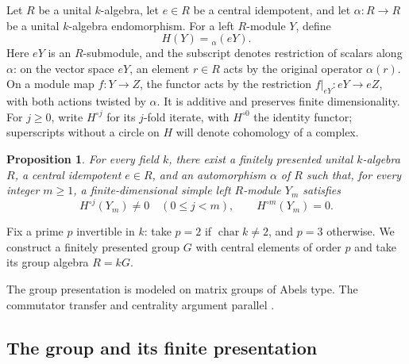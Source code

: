 \documentclass[11pt]{article}
\numberwithin{equation}{section}
\newtheorem{proposition}[theorem]{Proposition}
\theoremstyle{definition}
\theoremstyle{remark}
\begin{document}
Let $R$ be a unital $k$-algebra, let $e\in R$ be a central idempotent,
and let $\alpha:R\to R$ be a unital $k$-algebra endomorphism.  For a left
$R$-module $Y$, define
\begin{equation}
  H(Y)={}_{\alpha}(eY).
  \label{eq:selection-functor}
\end{equation}
Here $eY$ is an $R$-submodule, and the subscript denotes restriction of
scalars along $\alpha$: on the vector space $eY$, an element $r\in R$
acts by the original operator $\alpha(r)$. On a module map $f:Y\to Z$,
the functor acts by the restriction $f|_{eY}:eY\to eZ$, with both actions
twisted by $\alpha$. It is additive and preserves finite dimensionality.
For $j\ge0$, write $H^{\circ j}$ for its $j$-fold iterate, with
$H^{\circ 0}$ the identity functor; superscripts without a circle on
$H$ will denote cohomology of a complex.

\begin{proposition}
\label{prop:selection}
For every field $k$, there exist a finitely presented unital $k$-algebra $R$, a central
idempotent $e\in R$, and an automorphism $\alpha$ of $R$ such that, for
every integer $m\geq 1$, a finite-dimensional simple left $R$-module $Y_m$
satisfies
\begin{equation}
  H^{\circ j}(Y_m)\neq 0\quad(0\leq j<m),
  \qquad H^{\circ m}(Y_m)=0.
  \label{eq:extinction}
\end{equation}
\end{proposition}

Fix a prime $p$ invertible in $k$: take $p=2$ if $\operatorname{char}k\ne2$,
and $p=3$ otherwise. We construct a finitely presented group $G$
with central elements of order $p$ and take its group algebra $R=kG$.

The group presentation is modeled on matrix groups of Abels type.
The commutator transfer and centrality argument parallel
\cite[Proposition~4.9, equations~(4.9)--(4.10)]{Rego2022}.

\subsection{The group and its finite presentation}
\end{document}

